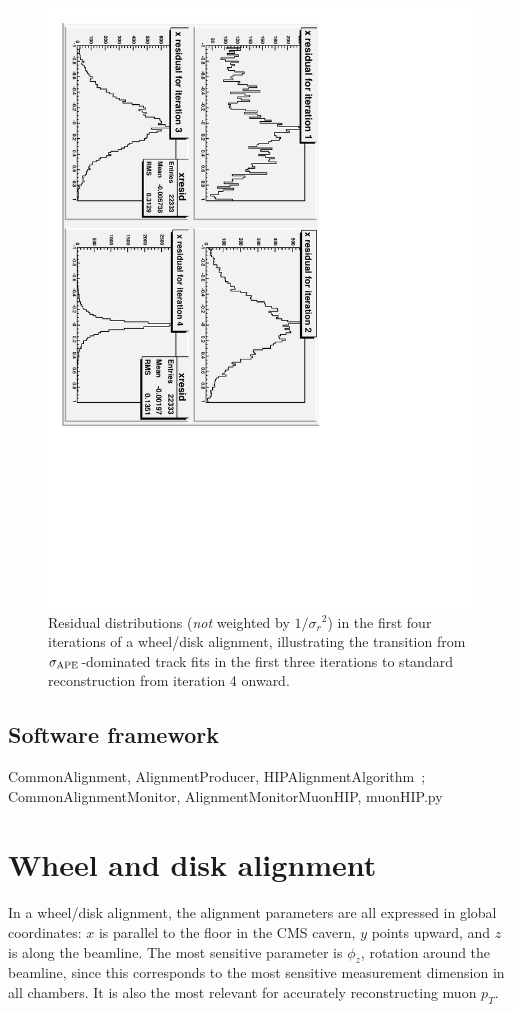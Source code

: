 \documentclass[12pt]{article}
\begin{document}
\begin{figure}
\begin{center}
\includegraphics[height=0.75\linewidth, angle=90]{disk_alignment/residuals_by_iteration.pdf}
\end{center}

\caption{\label{residuals_by_iteration} Residual distributions ({\it not}
  weighted by $1/{\sigma_r}^2$) in the first four iterations of a wheel/disk
  alignment, illustrating the transition from
  $\sigma_{\mbox{\scriptsize APE}}$-dominated track fits in the first
  three iterations to standard reconstruction from iteration 4
  onward.}
\end{figure}

\subsection{Software framework}

CommonAlignment, AlignmentProducer,
HIPAlignmentAlgorithm~\cite{alignment_software};
CommonAlignmentMonitor, AlignmentMonitorMuonHIP,
muonHIP.py~\cite{my_alignment_software}

\section{Wheel and disk alignment}

In a wheel/disk alignment, the alignment parameters are all expressed
in global coordinates: $x$ is parallel to the floor in the CMS cavern,
$y$ points upward, and $z$ is along the beamline.  The most sensitive
parameter is $\phi_z$, rotation around the beamline, since this
corresponds to the most sensitive measurement dimension in all
chambers.  It is also the most relevant for accurately reconstructing
muon $p_T$.
\end{document}
